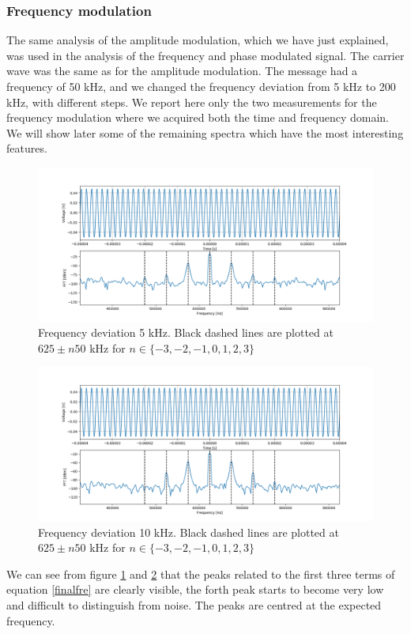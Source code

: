 \documentclass[a4paper,10pt]{article}
\begin{document}
\subsubsection{Frequency modulation}
The same analysis of the amplitude modulation, which we have just explained, was used in the analysis of the frequency and phase modulated signal. The carrier wave was the same as for the amplitude modulation. The message had a frequency of 50 kHz, and we changed the frequency deviation from 5 kHz to 200 kHz, with different steps. We report here only the two measurements for the frequency modulation where we acquired both the time and frequency domain. We will show later some of the remaining spectra which have the most interesting features.
\begin{figure}[H]
\centering
\includegraphics[width=\textwidth]{freq1}
\caption{Frequency deviation 5 kHz. Black dashed lines are plotted at $625\pm n50$ kHz for $n\in\{-3,-2,-1,0,1,2,3\}$}\label{freq1}
\end{figure}
\begin{figure}[H]
\centering
\includegraphics[width=\textwidth]{freq2}
\caption{Frequency deviation 10 kHz. Black dashed lines are plotted at $625\pm n50$ kHz for $n\in\{-3,-2,-1,0,1,2,3\}$}\label{freq2}
\end{figure}
We can see from figure \ref{freq1} and \ref{freq2} that the peaks related to the first three terms of equation \eqref{finalfre} are clearly visible, the forth peak starts to become very low and difficult to distinguish from noise. The peaks are centred at the expected frequency.
\end{document}

